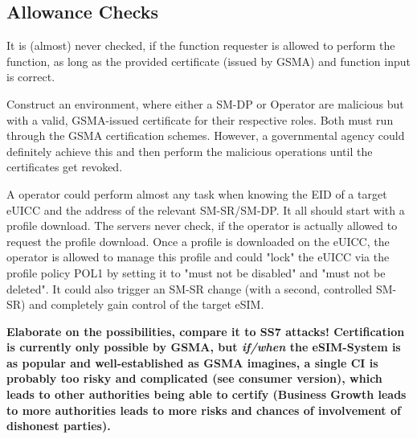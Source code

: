 \subsection{Allowance Checks}
It is (almost) never checked, if the function requester is allowed to perform the function, as long as the provided certificate (issued by GSMA) and function input is correct.

Construct an environment, where either a SM-DP or Operator are malicious but with a valid, GSMA-issued certificate for their respective roles. Both must run through the GSMA certification schemes. However, a governmental agency could definitely achieve this and then perform the malicious operations until the certificates get revoked.

A operator could perform almost any task when knowing the EID of a target eUICC and the address of the relevant SM-SR/SM-DP. It all should start with a profile download. The servers never check, if the operator is actually allowed to request the profile download. Once a profile is downloaded on the eUICC, the operator is allowed to manage this profile and could "lock" the eUICC via the profile policy POL1 by setting it to "must not be disabled" and "must not be deleted". It could also trigger an SM-SR change (with a second, controlled SM-SR) and completely gain control of the target eSIM.

\textbf{Elaborate on the possibilities, compare it to SS7 attacks! Certification is currently only possible by GSMA, but \textit{if/when} the eSIM-System is as popular and well-established as GSMA imagines, a single CI is probably too risky and complicated (see consumer version), which leads to other authorities being able to certify (Business Growth leads to more authorities leads to more risks and chances of involvement of dishonest parties).}

